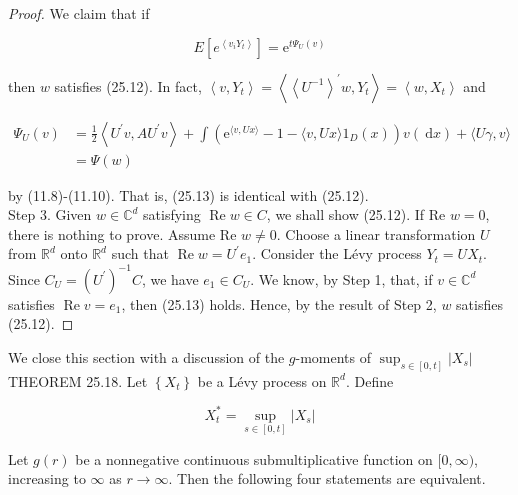 \documentclass[a4paper,11pt]{article}
\begin{document}
\begin{proof}
    We claim that if

    \begin{equation*}
        E\left[e^{\left\langle v_{i} Y_{t}\right\rangle}\right]=\mathrm{e}^{t \Psi_{U}(v)} \tag{25.13}
    \end{equation*}

    then $w$ satisfies (25.12). In fact, $\left\langle v, Y_{t}\right\rangle=\left\langle\left\langle U^{-1}\right\rangle^{\prime} w, Y_{t}\right\rangle=\left\langle w, X_{t}\right\rangle$
    and

    $$
        \begin{aligned}
            \Psi_{U}(v) & =\frac{1}{2}\left\langle U^{\prime} v, A U^{\prime} v\right\rangle+\int\left(\mathrm{e}^{\langle v, U x\rangle}-1-\langle v, U x\rangle 1_{D}(x)\right) v(\mathrm{~d} x)+\langle U \gamma, v\rangle \\
                        & =\Psi(w)
        \end{aligned}
    $$

    by (11.8)-(11.10). That is, (25.13) is identical with (25.12). \\

    Step 3. Given $w \in \mathbb{C}^{d}$ satisfying $\operatorname{Re} w \in C$, we shall
    show (25.12). If Re $w=0$, there is nothing to prove. Assume Re $w \neq 0$. Choose a
    linear transformation $U$ from $\mathbb{R}^{d}$ onto $\mathbb{R}^{d}$ such that $\operatorname{Re} w=U^{\prime} e_{1}$.
    Consider the Lévy process $Y_{t}=U X_{t}$. Since $C_{U}=\left(U^{\prime}\right)^{-1} C$, we have $e_{1} \in C_{U}$.
    We know, by Step 1, that, if $v \in \mathbb{C}^{d}$ satisfies $\operatorname{Re} v=e_{1}$, then (25.13) holds.
    Hence, by the result of Step 2, $w$ satisfies (25.12).

\end{proof}

We close this section with a discussion of the $g$-moments of $\sup _{s \in[0, t]}\left|X_{s}\right|$ \\

THEOREM 25.18. Let $\left\{X_{t}\right\}$ be a Lévy process on $\mathbb{R}^{d}$. Define

\begin{equation*}
    X_{t}^{*}=\sup _{s \in[0, t]}\left|X_{s}\right| \tag{25.14}
\end{equation*}

Let $g(r)$ be a nonnegative continuous submultiplicative function on $[0, \infty)$, increasing to $\infty$ as $r \rightarrow \infty$.
Then the following four statements are equivalent.
\end{document}
